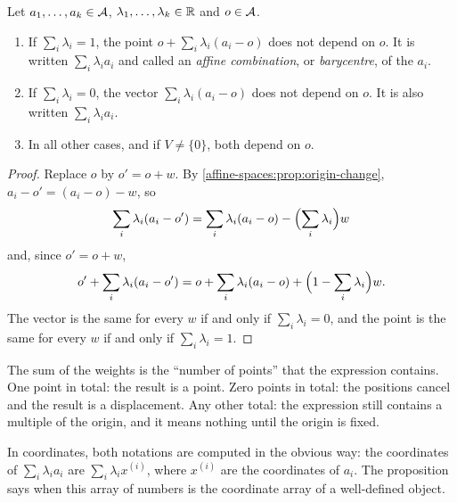 \begin{notechapter}
\begin{proposition}\label{affine-spaces:prop:affine-comb}
Let $a_1,\dots,a_k\in\mathcal{A}$, $\lambda_1,\dots,\lambda_k\in\mathbb{R}$ and $o\in\mathcal{A}$.
\begin{enumerate}[nosep]
  \item If $\sum_i\lambda_i = 1$, the point $o + \sum_i\lambda_i(a_i - o)$ does
        not depend on $o$. It is written $\sum_i\lambda_ia_i$ and called an
        \emph{affine combination}, or \emph{barycentre}, of the $a_i$.
  \item If $\sum_i\lambda_i = 0$, the vector $\sum_i\lambda_i(a_i - o)$ does
        not depend on $o$. It is also written $\sum_i\lambda_ia_i$.
  \item In all other cases, and if $V\neq\{0\}$, both depend on $o$.
\end{enumerate}
\end{proposition}

\begin{proof}
Replace $o$ by $o' = o + w$. By \cref{affine-spaces:prop:origin-change},
$a_i - o' = (a_i - o) - w$, so
\[
  \sum_i\lambda_i(a_i - o') = \sum_i\lambda_i(a_i - o)
  - \Bigl(\sum_i\lambda_i\Bigr)w
\]
and, since $o' = o + w$,
\[
  o' + \sum_i\lambda_i(a_i - o') = o + \sum_i\lambda_i(a_i - o)
  + \Bigl(1 - \sum_i\lambda_i\Bigr)w .
\]
The vector is the same for every $w$ if and only if $\sum_i\lambda_i = 0$,
and the point is the same for every $w$ if and only if
$\sum_i\lambda_i = 1$.
\end{proof}

\begin{intuition}
The sum of the weights is the ``number of points'' that the expression
contains. One point in total: the result is a point. Zero points in total:
the positions cancel and the result is a displacement. Any other total:
the expression still contains a multiple of the origin, and it means
nothing until the origin is fixed.
\end{intuition}

In coordinates, both notations are computed in the obvious way: the
coordinates of $\sum_i\lambda_ia_i$ are $\sum_i\lambda_ix^{(i)}$, where
$x^{(i)}$ are the coordinates of $a_i$. The proposition says when this
array of numbers is the coordinate array of a well-defined object.


\end{notechapter}
